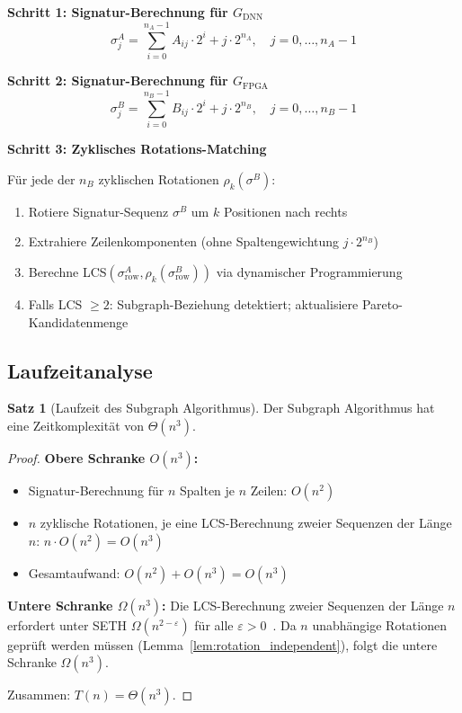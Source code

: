 ﻿\documentclass[a4paper,12pt]{article}
\theoremstyle{definition}
\newtheorem{satz}{Satz}
\begin{document}
\medskip
\textbf{Schritt 1: Signatur-Berechnung für $G_{\text{DNN}}$}
\[
    \sigma_j^A = \sum_{i=0}^{n_A-1} A_{ij} \cdot 2^i + j \cdot 2^{n_A}, \quad j = 0, \ldots, n_A - 1
\]

\textbf{Schritt 2: Signatur-Berechnung für $G_{\text{FPGA}}$}
\[
    \sigma_j^B = \sum_{i=0}^{n_B-1} B_{ij} \cdot 2^i + j \cdot 2^{n_B}, \quad j = 0, \ldots, n_B - 1
\]

\textbf{Schritt 3: Zyklisches Rotations-Matching}

Für jede der $n_B$ zyklischen Rotationen $\rho_k(\sigma^B)$:
\begin{enumerate}
    \item Rotiere Signatur-Sequenz $\sigma^B$ um $k$ Positionen nach rechts
    \item Extrahiere Zeilenkomponenten (ohne Spaltengewichtung $j \cdot 2^{n_B}$)
    \item Berechne LCS$(\sigma^A_{\text{row}}, \rho_k(\sigma^B_{\text{row}}))$ via dynamischer Programmierung
    \item Falls LCS $\geq 2$: Subgraph-Beziehung detektiert; aktualisiere Pareto-Kandidatenmenge
\end{enumerate}

\subsection{Laufzeitanalyse}

\begin{satz}[Laufzeit des Subgraph Algorithmus]
\label{satz:laufzeit}
    Der Subgraph Algorithmus hat eine Zeitkomplexität von $\Theta(n^3)$.
\end{satz}

\begin{proof}
    \textbf{Obere Schranke $O(n^3)$:}
    \begin{itemize}
        \item Signatur-Berechnung für $n$ Spalten je $n$ Zeilen: $O(n^2)$
        \item $n$ zyklische Rotationen, je eine LCS-Berechnung zweier Sequenzen der Länge $n$: $n \cdot O(n^2) = O(n^3)$
        \item Gesamtaufwand: $O(n^2) + O(n^3) = O(n^3)$
    \end{itemize}
    
    \textbf{Untere Schranke $\Omega(n^3)$:}
    Die LCS-Berechnung zweier Sequenzen der Länge $n$ erfordert unter SETH
    $\Omega(n^{2-\varepsilon})$ für alle $\varepsilon > 0$~\cite{abboud2015}.
    Da $n$ unabhängige Rotationen geprüft werden müssen (Lemma~\ref{lem:rotation_independent}),
    folgt die untere Schranke $\Omega(n^3)$.
    
    Zusammen: $T(n) = \Theta(n^3)$.
\end{proof}
\end{document}
